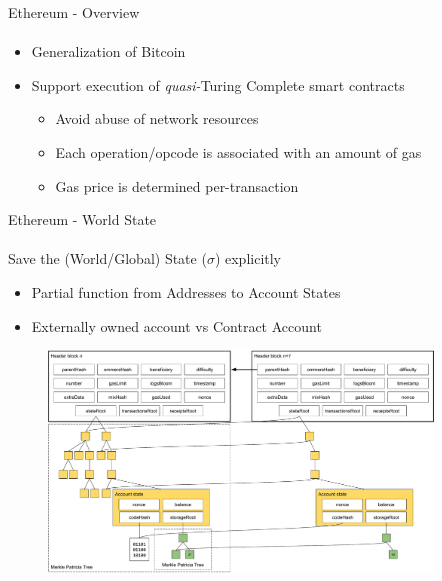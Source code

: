 \begin{frame}{Ethereum - Overview}
    \framesubtitle{\cite{bib:yellow}}
    \begin{itemize}
        \item Generalization of Bitcoin
        \item Support execution of \emph{quasi-}Turing Complete smart contracts
        \begin{itemize}
            \item Avoid abuse of network resources
            \item Each operation/opcode is associated with an amount of gas 
            \item Gas price is determined per-transaction
        \end{itemize}
    \end{itemize}
\end{frame}

\begin{frame}{Ethereum - World State}
    \framesubtitle{\cite{bib:yellow}}
    Save the (World/Global) State ($\sigma$) explicitly
    \begin{itemize}
    \item Partial function from Addresses to Account States
    \item Externally owned account vs Contract Account
    \end{itemize}    
    
    \begin{figure}
        \begin{center}
            \includegraphics[width=0.91\textwidth]{./img/world-state}
        \end{center}
    \end{figure}
\end{frame}

